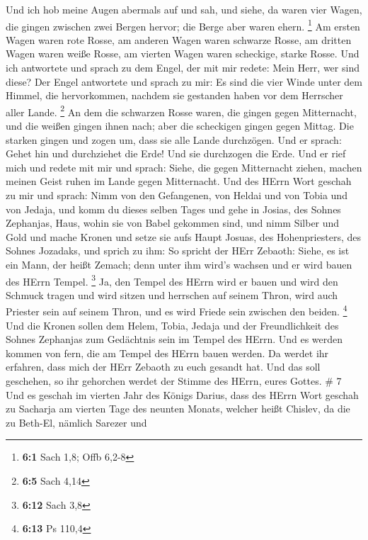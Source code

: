  Und ich hob meine Augen abermals auf und sah, und siehe, da
waren vier Wagen, die gingen zwischen zwei Bergen hervor; die Berge aber
waren ehern. \footnote{\textbf{6:1} Sach 1,8; Offb 6,2-8} 
Am ersten Wagen waren rote Rosse, am anderen Wagen waren schwarze Rosse,
 am dritten Wagen waren weiße Rosse, am vierten Wagen waren
scheckige, starke Rosse.  Und ich antwortete und sprach zu
dem Engel, der mit mir redete: Mein Herr, wer sind diese? 
Der Engel antwortete und sprach zu mir: Es sind die vier Winde unter dem
Himmel, die hervorkommen, nachdem sie gestanden haben vor dem Herrscher
aller Lande. \footnote{\textbf{6:5} Sach 4,14}  An dem die
schwarzen Rosse waren, die gingen gegen Mitternacht, und die weißen
gingen ihnen nach; aber die scheckigen gingen gegen Mittag. 
Die starken gingen und zogen um, dass sie alle Lande durchzögen. Und er
sprach: Gehet hin und durchziehet die Erde! Und sie durchzogen die Erde.
 Und er rief mich und redete mit mir und sprach: Siehe, die
gegen Mitternacht ziehen, machen meinen Geist ruhen im Lande gegen
Mitternacht.  Und des HErrn Wort geschah zu mir und sprach:
 Nimm von den Gefangenen, von Heldai und von Tobia und von
Jedaja, und komm du dieses selben Tages und gehe in Josias, des Sohnes
Zephanjas, Haus, wohin sie von Babel gekommen sind,  und
nimm Silber und Gold und mache Kronen und setze sie aufs Haupt Josuas,
des Hohenpriesters, des Sohnes Jozadaks,  und sprich zu
ihm: So spricht der HErr Zebaoth: Siehe, es ist ein Mann, der heißt
Zemach; denn unter ihm wird's wachsen und er wird bauen des HErrn
Tempel. \footnote{\textbf{6:12} Sach 3,8}  Ja, den Tempel
des HErrn wird er bauen und wird den Schmuck tragen und wird sitzen und
herrschen auf seinem Thron, wird auch Priester sein auf seinem Thron,
und es wird Friede sein zwischen den beiden. \footnote{\textbf{6:13} Ps
  110,4}  Und die Kronen sollen dem Helem, Tobia, Jedaja
und der Freundlichkeit des Sohnes Zephanjas zum Gedächtnis sein im
Tempel des HErrn.  Und es werden kommen von fern, die am
Tempel des HErrn bauen werden. Da werdet ihr erfahren, dass mich der
HErr Zebaoth zu euch gesandt hat. Und das soll geschehen, so ihr
gehorchen werdet der Stimme des HErrn, eures Gottes. \# 7 
Und es geschah im vierten Jahr des Königs Darius, dass des HErrn Wort
geschah zu Sacharja am vierten Tage des neunten Monats, welcher heißt
Chislev,  da die zu Beth-El, nämlich Sarezer und
